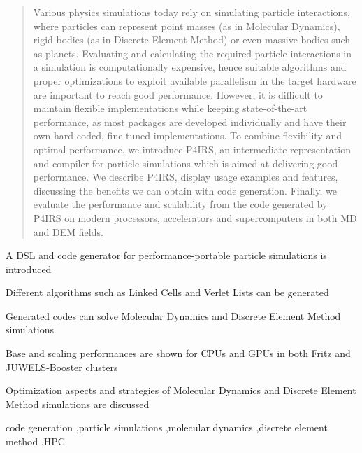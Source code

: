 \documentclass[preprint,12pt]{elsarticle}
\begin{document}
\begin{frontmatter}
\begin{abstract}
Various physics simulations today rely on simulating particle interactions, where particles can represent point masses (as in Molecular Dynamics), rigid bodies (as in Discrete Element Method) or even massive bodies such as planets.
Evaluating and calculating the required particle interactions in a simulation is computationally expensive, hence suitable algorithms and proper optimizations to exploit available parallelism in the target hardware are important to reach good performance.
However, it is difficult to maintain flexible implementations while keeping state-of-the-art performance, as most packages are developed individually and have their own hard-coded, fine-tuned implementations.
To combine flexibility and optimal performance, we introduce P4IRS, an intermediate representation and compiler for particle simulations which is aimed at delivering good performance.
We describe P4IRS, display usage examples and features, discussing the benefits we can obtain with code generation.
Finally, we evaluate the performance and scalability from the code generated by P4IRS on modern processors, accelerators and supercomputers in both MD and DEM fields.
\end{abstract}

\begin{graphicalabstract}
\end{graphicalabstract}

\begin{highlights}
\item A DSL and code generator for performance-portable particle simulations is introduced
\item Different algorithms such as Linked Cells and Verlet Lists can be generated
\item Generated codes can solve Molecular Dynamics and Discrete Element Method simulations
\item Base and scaling performances are shown for CPUs and GPUs in both Fritz and JUWELS-Booster clusters
\item Optimization aspects and strategies of Molecular Dynamics and Discrete Element Method simulations are discussed
\end{highlights}

\begin{keyword}


code generation \sep particle simulations \sep molecular dynamics \sep discrete element method \sep HPC
\end{keyword}

\end{frontmatter}
\end{document}
